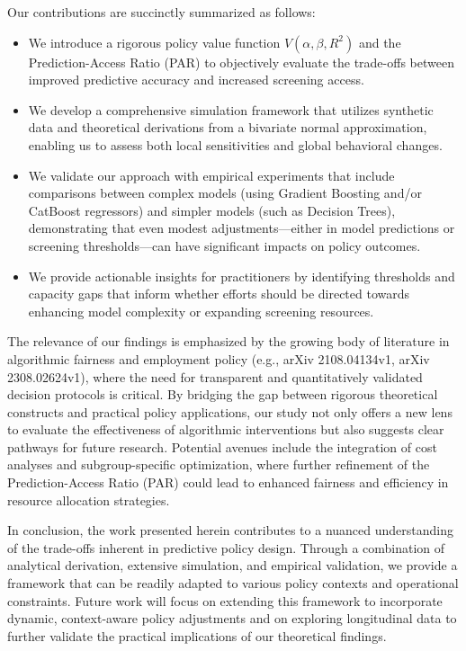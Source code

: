 \documentclass{article}
\begin{document}
Our contributions are succinctly summarized as follows:
\begin{itemize}
    \item We introduce a rigorous policy value function \( V(\alpha,\beta,R^2) \) and the Prediction-Access Ratio (PAR) to objectively evaluate the trade-offs between improved predictive accuracy and increased screening access.
    \item We develop a comprehensive simulation framework that utilizes synthetic data and theoretical derivations from a bivariate normal approximation, enabling us to assess both local sensitivities and global behavioral changes.
    \item We validate our approach with empirical experiments that include comparisons between complex models (using Gradient Boosting and/or CatBoost regressors) and simpler models (such as Decision Trees), demonstrating that even modest adjustments—either in model predictions or screening thresholds—can have significant impacts on policy outcomes.
    \item We provide actionable insights for practitioners by identifying thresholds and capacity gaps that inform whether efforts should be directed towards enhancing model complexity or expanding screening resources.
\end{itemize}

The relevance of our findings is emphasized by the growing body of literature in algorithmic fairness and employment policy (e.g., arXiv 2108.04134v1, arXiv 2308.02624v1), where the need for transparent and quantitatively validated decision protocols is critical. By bridging the gap between rigorous theoretical constructs and practical policy applications, our study not only offers a new lens to evaluate the effectiveness of algorithmic interventions but also suggests clear pathways for future research. Potential avenues include the integration of cost analyses and subgroup-specific optimization, where further refinement of the Prediction-Access Ratio (PAR) could lead to enhanced fairness and efficiency in resource allocation strategies.

In conclusion, the work presented herein contributes to a nuanced understanding of the trade-offs inherent in predictive policy design. Through a combination of analytical derivation, extensive simulation, and empirical validation, we provide a framework that can be readily adapted to various policy contexts and operational constraints. Future work will focus on extending this framework to incorporate dynamic, context-aware policy adjustments and on exploring longitudinal data to further validate the practical implications of our theoretical findings.
\end{document}
